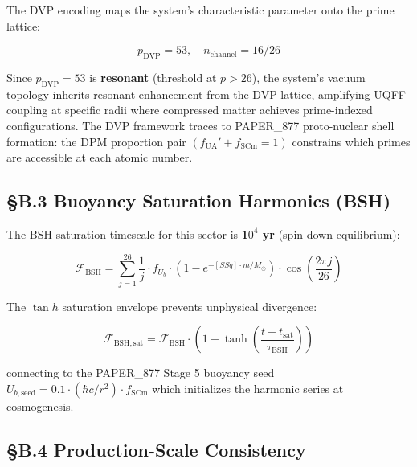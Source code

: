 \documentclass[12pt,a4paper]{article}
\begin{document}
The DVP encoding maps the system's characteristic parameter onto the prime lattice:

\begin{equation}
p_{\mathrm{DVP}} = 53, \quad n_{\mathrm{channel}} = 16/26
\end{equation}

Since $p_{\mathrm{DVP}} = 53$ is \textbf{resonant} (threshold at $p > 26$), the system's vacuum topology inherits resonant enhancement from the DVP lattice, amplifying UQFF coupling at specific radii where compressed matter achieves prime-indexed configurations. The DVP framework traces to PAPER\_877 proto-nuclear shell formation: the DPM proportion pair $(f_{\mathrm{UA}}' + f_{\mathrm{SCm}} = 1)$ constrains which primes are accessible at each atomic number.

\subsection{\S{}B.3 Buoyancy Saturation Harmonics (BSH)}

The BSH saturation timescale for this sector is \textbf{1$0^{4}$ yr} (spin-down equilibrium):

\begin{equation}
\mathcal{F}_{\mathrm{BSH}} = \sum_{j=1}^{26} \frac{1}{j} \cdot f_U_b \cdot \left(1 - e^{-[SSq] \cdot m/M_\odot}\right) \cdot \cos\!\left(\frac{2\pi j}{26}\right)
\end{equation}

The $\tan h$ saturation envelope prevents unphysical divergence:

\begin{equation}
\mathcal{F}_{\mathrm{BSH,sat}} = \mathcal{F}_{\mathrm{BSH}} \cdot \left(1 - \tanh\!\left(\frac{t - t_{\mathrm{sat}}}{\tau_{\mathrm{BSH}}}\right)\right)
\end{equation}

connecting to the PAPER\_877 Stage 5 buoyancy seed $U_{b,\mathrm{seed}} = 0.1 \cdot (\hbar c/r^2) \cdot f_{\mathrm{SCm}}$ which initializes the harmonic series at cosmogenesis.

\subsection{\S{}B.4 Production-Scale Consistency}
\end{document}
